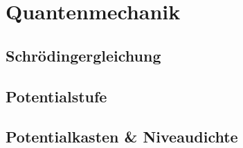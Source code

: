 \section{Quantenmechanik}%
\label{quantmech:sec:quantenmechanik}

\subsection{Schrödingergleichung}%
\label{quantmech:sub:schroedingergleichung}

\subsection{Potentialstufe}%
\label{quantmech:sub:potentialstufe}

\subsection{Potentialkasten \& Niveaudichte}%
\label{quantmech:sub:potentialkasten_niveaudichte}
